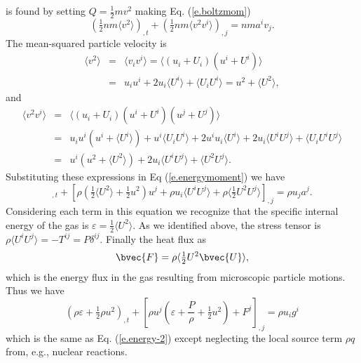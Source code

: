  is found by setting $Q=\tfrac{1}{2}mv^2$ making Eq. (\ref{e.boltzmom})
\begin{equation}
  (\tfrac{1}{2}nm\langle v^2 \rangle)_{,t} + (\tfrac{1}{2}nm\langle v^2 v^i\rangle)_{,j} = nma^i v_j. \label{e.energymoment}
\end{equation}
The mean-squared particle velocity is
\begin{eqnarray}
  \langle v^2 \rangle &=& \langle v_i v^i \rangle = \langle (u_i + U_i)(u^i+U^i)\rangle \nonumber\\
  &=& u_i u^i + 2u_i\langle U^i\rangle + \langle U_i U^i\rangle = u^2 + \langle U^2 \rangle,
\end{eqnarray}
and
\begin{eqnarray}
  \langle v^2 v^i \rangle &=& \langle (u_i+U_i)(u^i+U^i)(u^j+U^j)\rangle \nonumber\\
  &=& u_iu^i (u^i+\langle U^i\rangle) + u^i\langle U_iU^i\rangle + 2u^iu_i\langle U^i\rangle + 2u_i\langle U^i U^j\rangle + \langle U_iU^i U^j\rangle \nonumber\\
  &=& u^i(u^2+\langle U^2\rangle) + 2u_i \langle U^i U^j\rangle + \langle U^2 U^j\rangle.
\end{eqnarray}
Substituting these expressions in Eq (\ref{e.energymoment}) we have
\begin{equation}
  [\rho(\tfrac{1}{2}\langle U^2\rangle + \tfrac{1}{2}u^2)]_{,t} + [\rho(\tfrac{1}{2}\langle U^2\rangle + \tfrac{1}{2}u^2)u^j + \rho u_i\langle U^i U^j\rangle + \rho \langle\tfrac{1}{2}U^2U^j\rangle]_{,j} = \rho u_j a^j.
\end{equation}
Considering each term in this equation we recognize that the specific internal energy of the gas is $\varepsilon = \tfrac{1}{2}\langle U^2\rangle$.
As we identified above, the stress tensor is $\rho\langle U^i U^j\rangle = -T^{ij} = P \delta^{ij}$.
Finally the {heat flux}  as
\begin{equation}
  \bvec{F} = \rho \langle\tfrac{1}{2}U^2 \bvec{U}\rangle,
\end{equation}
which is the energy flux in the gas resulting from microscopic particle motions.
Thus we have
\begin{equation}
  (\rho \varepsilon + \tfrac{1}{2}\rho u^2)_{,t} + [\rho u^j(\varepsilon + \frac{P}{\rho}+\tfrac{1}{2}u^2) + F^j]_{,j} = \rho u_i g^i
\end{equation}
which is the same as Eq. (\ref{e.energy-2}) except neglecting the local source term $\rho q$ from, e.g., nuclear reactions.

